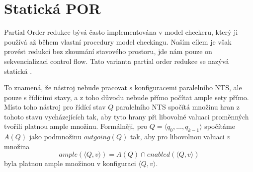 \documentclass[12pt]{fithesis2}
\newcommand{\tuple}[1]{\langle #1 \rangle}
\begin{document}
\section{Statická POR}
\label{sec:por-static}
Partial Order redukce bývá často implementována v model checkeru, který ji používá až během vlastní procedury model checkingu. Naším cílem je však provést redukci bez zkoumání stavového prostoru, jde nám pouze on sekvencializaci control flow. Tato varianta partial order redukce se nazývá statická \cite{SPOR}.

To znamená, že nástroj nebude pracovat s konfiguracemi paralelního NTS, ale pouze s řídícími stavy, a z toho důvodu nebude přímo počítat ample sety přímo. Místo toho nástroj pro řídící stav $Q$ paralelního NTS spočítá množinu hran z tohoto stavu vycházejících tak, aby tyto hrany při libovolné valuaci proměnných tvořili platnou ample množinu. Formálněji, pro $Q = \tuple{q_{0}, \ldots, q_{k-1}}$ spočítáme $A(Q)$ jako podmnožinu $\mathit{outgoing}(Q)$ tak, aby pro libovolnou valuaci $v$ množina
\begin{equation}
\mathit{ample}\left({\tuple{Q, v}}\right) = A(Q) \cap \mathit{enabled}\left({\tuple{Q, v}}\right)
\end{equation}
byla platnou ample množinou v konfiguraci $\tuple{Q,v}$.
\end{document}
